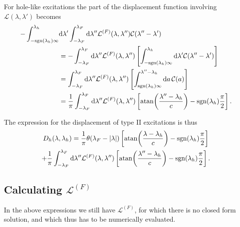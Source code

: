 \documentclass[11pt, a4paper,draft]{report} %
\newcommand{\inversetruncc}{\mathcal{L}}
\newcommand{\kernel}{\mathcal{C}}
\begin{document}
For hole-like excitations the part of the displacement function involving \(\inversetruncc(\lambda,\lambda')\) becomes
\begin{align}
	 - \int_{-\textrm{sgn}(\lambda_h)\infty}^{\lambda_h} &\dd \lambda' \int_{-\lambda_F}^{\lambda_F} \dd \lambda''  \inversetruncc^{(F)}(\lambda,\lambda'') \kernel(\lambda''-\lambda')\\
	 &= - \int_{-\lambda_F}^{\lambda_F} \dd \lambda''  \inversetruncc^{(F)}(\lambda,\lambda'')\left[ \int_{-\textrm{sgn}(\lambda_h)\infty}^{\lambda_h} \dd \lambda' \kernel(\lambda''-\lambda')\right]\\
	 &= \int_{-\lambda_F}^{\lambda_F} \dd \lambda''  \inversetruncc^{(F)}(\lambda,\lambda'')\left[ \int_{\textrm{sgn}(\lambda_h)\infty}^{\lambda''-\lambda_h} \dd a \, \kernel(a)\right]\\
	 &= \frac{1}{\pi}\int_{-\lambda_F}^{\lambda_F} \dd  \lambda''  \inversetruncc^{(F)}(\lambda,\lambda'')\left[ \atan(\frac{\lambda''-\lambda_h}{c}) - \textrm{sgn}(\lambda_h)\frac{\pi}{2}\right].
\end{align}

The expression for the displacement of type II excitations is thus
\begin{multline}
	D_h(\lambda, \lambda_h) = \frac{1}{\pi}\theta(\lambda_F - \lvert \lambda \rvert) \left[ \atan(\frac{\lambda-\lambda_h}{c}) - \textrm{sgn}(\lambda_h)\frac{\pi}{2}\right] \\+
	\frac{1}{\pi}\int_{-\lambda_F}^{\lambda_F} \dd  \lambda''  \inversetruncc^{(F)}(\lambda,\lambda'')\left[ \atan(\frac{\lambda''-\lambda_h}{c}) - \textrm{sgn}(\lambda_h)\frac{\pi}{2}\right].
\end{multline}

\subsection{Calculating \(\inversetruncc^{(F)}\)}

In the above expressions we still have \(\inversetruncc^{(F)}\), for which there is no closed form solution, and which thus has to be numerically evaluated.
\end{document}
